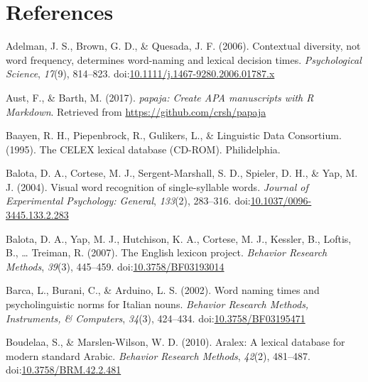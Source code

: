 \documentclass[english,,man]{apa6}
\theoremstyle{definition}
\theoremstyle{definition}
\theoremstyle{definition}
\theoremstyle{remark}
\begin{document}
\newpage

\hypertarget{references}{%
\section{References}\label{references}}

\setlength{\parindent}{-0.5in}
\setlength{\leftskip}{0.5in}

\hypertarget{refs}{}
\leavevmode\hypertarget{ref-Adelman2006}{}%
Adelman, J. S., Brown, G. D., \& Quesada, J. F. (2006). Contextual
diversity, not word frequency, determines word-naming and lexical
decision times. \emph{Psychological Science}, \emph{17}(9), 814--823.
doi:\href{https://doi.org/10.1111/j.1467-9280.2006.01787.x}{10.1111/j.1467-9280.2006.01787.x}

\leavevmode\hypertarget{ref-R-papaja}{}%
Aust, F., \& Barth, M. (2017). \emph{papaja: Create APA manuscripts with
R Markdown}. Retrieved from \url{https://github.com/crsh/papaja}

\leavevmode\hypertarget{ref-Baayen1995}{}%
Baayen, R. H., Piepenbrock, R., Gulikers, L., \& Linguistic Data
Consortium. (1995). The CELEX lexical database (CD-ROM). Philidelphia.

\leavevmode\hypertarget{ref-Balota2004}{}%
Balota, D. A., Cortese, M. J., Sergent-Marshall, S. D., Spieler, D. H.,
\& Yap, M. J. (2004). Visual word recognition of single-syllable words.
\emph{Journal of Experimental Psychology: General}, \emph{133}(2),
283--316.
doi:\href{https://doi.org/10.1037/0096-3445.133.2.283}{10.1037/0096-3445.133.2.283}

\leavevmode\hypertarget{ref-Balota2007}{}%
Balota, D. A., Yap, M. J., Hutchison, K. A., Cortese, M. J., Kessler,
B., Loftis, B., \ldots{} Treiman, R. (2007). The English lexicon
project. \emph{Behavior Research Methods}, \emph{39}(3), 445--459.
doi:\href{https://doi.org/10.3758/BF03193014}{10.3758/BF03193014}

\leavevmode\hypertarget{ref-Barca2002}{}%
Barca, L., Burani, C., \& Arduino, L. S. (2002). Word naming times and
psycholinguistic norms for Italian nouns. \emph{Behavior Research
Methods, Instruments, \& Computers}, \emph{34}(3), 424--434.
doi:\href{https://doi.org/10.3758/BF03195471}{10.3758/BF03195471}

\leavevmode\hypertarget{ref-Boudelaa2010}{}%
Boudelaa, S., \& Marslen-Wilson, W. D. (2010). Aralex: A lexical
database for modern standard Arabic. \emph{Behavior Research Methods},
\emph{42}(2), 481--487.
doi:\href{https://doi.org/10.3758/BRM.42.2.481}{10.3758/BRM.42.2.481}
\end{document}
